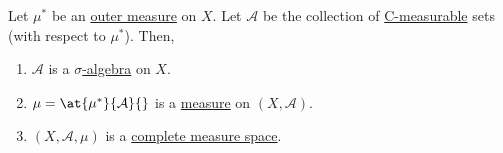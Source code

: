 \begin{theorem}\label{thm:Caratheodory-extension-Thm}
	Let \(\mu^{*} \) be an \hyperref[def:outer-measure]{outer measure} on \(X\). Let \(\mathcal{A} \) be the collection of \hyperref[def:C-measurable]{C-measurable} sets (with respect to \(\mu^{*} \)).
	Then,
	\begin{enumerate}[(1)]
		\item \(\mathcal{A}\) is a \hyperref[def:sigma-algebra]{\(\sigma\)-algebra} on \(X\).
		\item \(\mu = \at{\mu^{*} }{\mathcal{A} }{}\) is a \hyperref[def:measure]{measure} on \((X, \mathcal{A})\).
		\item \((X, \mathcal{A} , \mu)\) is a \hyperref[def:complete-measure-space]{complete measure space}.
	\end{enumerate}
\end{theorem}

